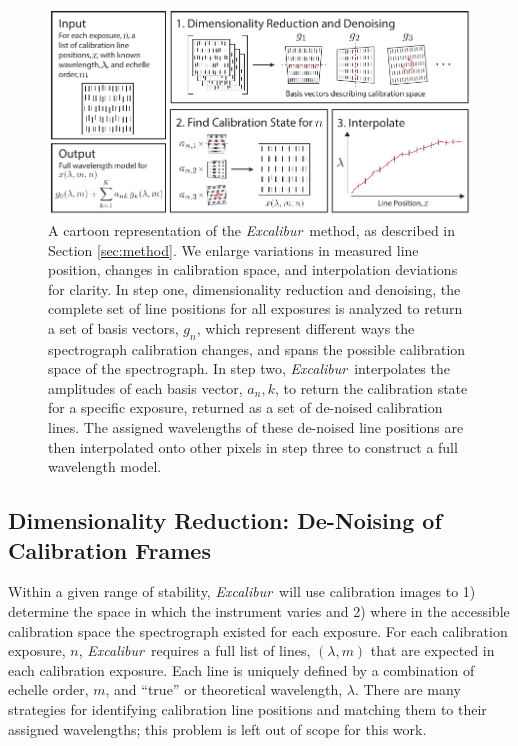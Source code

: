 \documentclass[modern]{aastex63}
\newcommand{\project}[1]{\textsl{#1}}
\newcommand{\name}{\project{Excalibur}}
\begin{document}
\begin{figure}[h]
\centering
\includegraphics[width=\textwidth]{Figures/methodCartoon.pdf}
\caption{A cartoon representation of the \name\ method, as described in Section \ref{sec:method}.  We enlarge variations in measured line position, changes in calibration space, and interpolation deviations for clarity.  In step one, dimensionality reduction and denoising, the complete set of line positions for all exposures is analyzed to return a set of basis vectors, $g_n$, which represent different ways the spectrograph calibration changes, and spans the possible calibration space of the spectrograph.  In step two, \name\ interpolates the amplitudes of each basis vector, $a_n,k$, to return the calibration state for a specific exposure, returned as a set of de-noised calibration lines.  The assigned wavelengths of these de-noised line positions are then interpolated onto other pixels in step three to construct a full wavelength model.}
\label{fig:testHists}
\end{figure} 

\subsection{Dimensionality Reduction: De-Noising of Calibration Frames} \label{sec:denoising}
Within a given range of stability, \name\ will use calibration images to  1) determine the space in which the instrument varies and 2) where in the accessible calibration space the spectrograph existed for each exposure.  For each calibration exposure, $n$, \name\ requires a full list of lines, $(\lambda,m)$ that are expected in each calibration exposure.  Each line is uniquely defined by a combination of echelle order, $m$, and ``true'' or theoretical wavelength, $\lambda$.  There are many strategies for identifying calibration line positions and matching them to their assigned wavelengths; this problem is left out of scope for this work.
\end{document}

